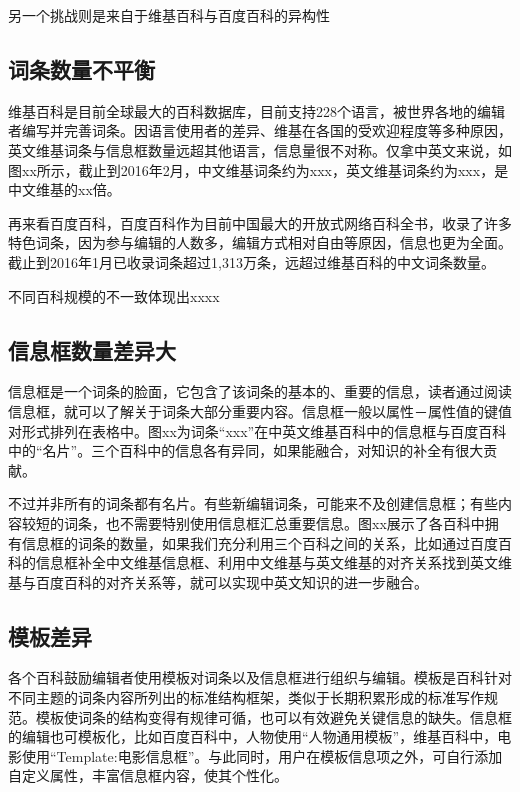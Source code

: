 另一个挑战则是来自于维基百科与百度百科的异构性

\subsection{词条数量不平衡}

维基百科是目前全球最大的百科数据库，目前支持228个语言，被世界各地的编辑者编写并完善词条。因语言使用者的差异、维基在各国的受欢迎程度等多种原因，英文维基词条与信息框数量远超其他语言，信息量很不对称。仅拿中英文来说，如图xx所示，截止到2016年2月，中文维基词条约为xxx，英文维基词条约为xxx，是中文维基的xx倍。

再来看百度百科，百度百科作为目前中国最大的开放式网络百科全书，收录了许多特色词条，因为参与编辑的人数多，编辑方式相对自由等原因，信息也更为全面。截止到2016年1月已收录词条超过1,313万条，远超过维基百科的中文词条数量。

不同百科规模的不一致体现出xxxx

\subsection{信息框数量差异大}

信息框是一个词条的脸面，它包含了该词条的基本的、重要的信息，读者通过阅读信息框，就可以了解关于词条大部分重要内容。信息框一般以属性－属性值的键值对形式排列在表格中。图xx为词条“xxx”在中英文维基百科中的信息框与百度百科中的“名片”。三个百科中的信息各有异同，如果能融合，对知识的补全有很大贡献。

不过并非所有的词条都有名片。有些新编辑词条，可能来不及创建信息框；有些内容较短的词条，也不需要特别使用信息框汇总重要信息。图xx展示了各百科中拥有信息框的词条的数量，如果我们充分利用三个百科之间的关系，比如通过百度百科的信息框补全中文维基信息框、利用中文维基与英文维基的对齐关系找到英文维基与百度百科的对齐关系等，就可以实现中英文知识的进一步融合。

\subsection{模板差异}

各个百科鼓励编辑者使用模板对词条以及信息框进行组织与编辑。模板是百科针对不同主题的词条内容所列出的标准结构框架，类似于长期积累形成的标准写作规范。模板使词条的结构变得有规律可循，也可以有效避免关键信息的缺失。信息框的编辑也可模板化，比如百度百科中，人物使用“人物通用模板”，维基百科中，电影使用“Template:电影信息框”。与此同时，用户在模板信息项之外，可自行添加自定义属性，丰富信息框内容，使其个性化。


